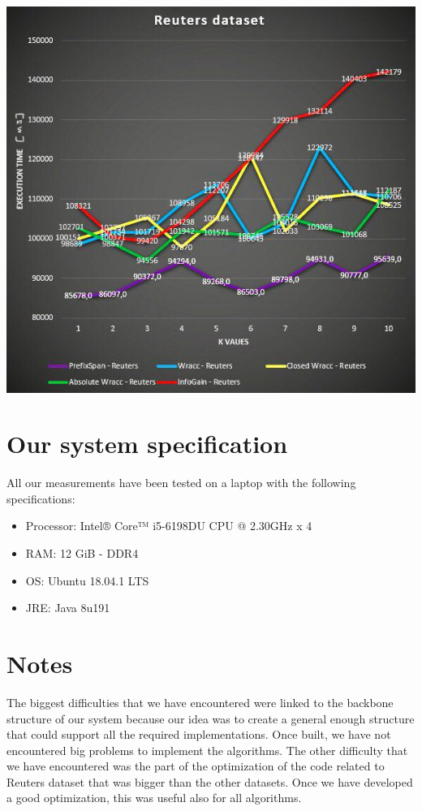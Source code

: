 \documentclass[10pt, a4paper]{article}
\begin{document}
	\begin{center}
	\includegraphics[scale =0.5]{reuters.JPG}\par\vspace{1cm}
	\end{center}

	\section{Our system specification}
		All our measurements have been tested on a laptop with the following specifications:
		\begin{multicols}{2}
			\begin{itemize}
				\item Processor: Intel® Core™ i5-6198DU CPU @ 2.30GHz x 4 
				\item RAM: 12 GiB - DDR4
				\item OS: Ubuntu 18.04.1 LTS
				\item JRE: Java 8u191
			\end{itemize}
		\end{multicols}
	
	\section{Notes}
	The biggest difficulties that we have encountered were linked to the backbone structure of our system because our idea was to create a general enough structure that could support all the required implementations. Once built, we have not encountered big problems to implement the algorithms. The other difficulty that we have encountered was the part of the optimization of the code related to Reuters dataset that was bigger than the other datasets. Once we have developed a good optimization, this was useful also for all algorithms.
		
\end{document}
